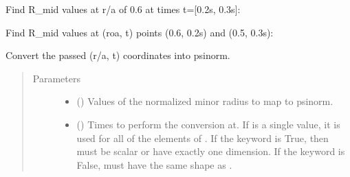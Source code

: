 \documentclass[letterpaper,10pt,english]{sphinxmanual}
\begin{document}
\begin{fulllineitems}
\begin{fulllineitems}
Find R\_mid values at r/a of 0.6 at times t={[}0.2s, 0.3s{]}:

\begin{sphinxVerbatim}[commandchars=\\\{\}]
   \PYG{p}{[} \PYG{p}{]}
\end{sphinxVerbatim}

Find R\_mid values at (roa, t) points (0.6, 0.2s) and (0.5, 0.3s):

\begin{sphinxVerbatim}[commandchars=\\\{\}]
  \PYG{p}{[} \PYG{p}{]} \PYG{p}{[} \PYG{p}{]} 
\end{sphinxVerbatim}

\end{fulllineitems}


\begin{fulllineitems}
\label{\detokenize{eqtools:eqtools.core.Equilibrium.roa2psinorm}}
Convert the passed (r/a, t) coordinates into psinorm.
\begin{quote}\begin{description}
\item[{Parameters}] \leavevmode\begin{itemize}
\item {} 
 () \textendash{} Values of the normalized minor
radius to map to psinorm.

\item {} 
 () \textendash{} Times to perform the conversion at.
If  is a single value, it is used for all of the elements of
. If the  keyword is True, then  must be scalar
or have exactly one dimension. If the  keyword is False,
 must have the same shape as .


\end{itemize}
\end{description}
\end{quote}
\end{fulllineitems}
\end{fulllineitems}
\end{document}

